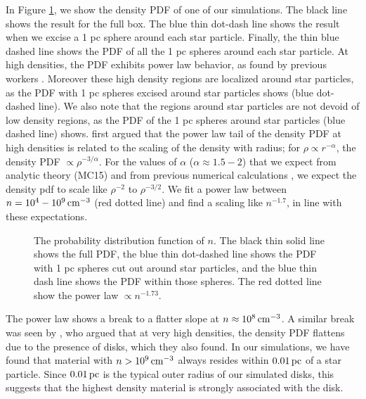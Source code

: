 \documentclass[../dissertation.tex]{subfiles}
\begin{document}
In Figure \ref{fig:hydro_PDF_quad1}, we show the density PDF of one of our simulations. 
The black line shows the result for the full box.
The blue thin dot-dash line shows the result when we excise a 1 pc sphere around each star particle.
Finally, the thin blue dashed line shows the PDF of all the 1 pc spheres around each star particle.
At high densities, the PDF exhibits power 
 law behavior, as found by previous workers
 \citep{2000ApJ...535..869K,2011ApJ...727L..20K,2015ApJ...800...49L}.  
Moreover these high density regions are localized around star particles, 
 as the PDF with 1 pc spheres excised around star particles shows (blue dot-dashed line). 
We also note that the regions around star particles are not devoid of low density regions, 
as the PDF of the 1 pc spheres around star particles (blue dashed line) shows. 
\citet{2011ApJ...727L..20K} first argued that the power law tail of the density PDF at high densities is related to the scaling of the density with radius; 
for $\rho \propto r^{-\alpha}$, the density PDF $\propto \rho^{-3/\alpha}$. 
For the values of $\alpha$ ($\alpha \approx 1.5-2$) that we expect from analytic theory (MC15) and from 
previous numerical calculations \citep{2015ApJ...800...49L}, we expect the density pdf 
 to scale like $\rho^{-2}$ to $\rho^{-3/2}$. 
We fit a power law between $n=10^4-10^9\,{\rm cm}^{-3}$ (red dotted line) and find a scaling like $n^{-1.7}$, in line with these expectations.

\begin{figure}[htb] %
\caption[Hydro Velocity vs. Density]{\label{fig:hydro_PDF_quad1}The probability distribution function of $n$. The black thin solid line
shows the full PDF, the blue thin dot-dashed line shows the PDF with 1 pc spheres 
cut out around star particles, and the blue thin dash line shows 
the PDF within those spheres. 
The red dotted line show the power law $\propto n^{-1.73}$.  }
\end{figure}

The power law shows a break to a flatter slope at $n\approx 10^8\,\rm cm^{-3}$. A similar 
break was seen by 
\citet{2011ApJ...727L..20K}, who argued that at very high densities, the density PDF 
flattens due to the presence of disks, which they also found. 
In our simulations,  we have found that 
material with $n>10^9\,{\rm cm}^{-3}$ always resides within 
$0.01 \,\rm pc$ of a star particle. Since $0.01\,\rm pc$ is the typical outer 
radius of our simulated disks, this suggests that the highest density material is strongly associated with the disk.
\end{document}
